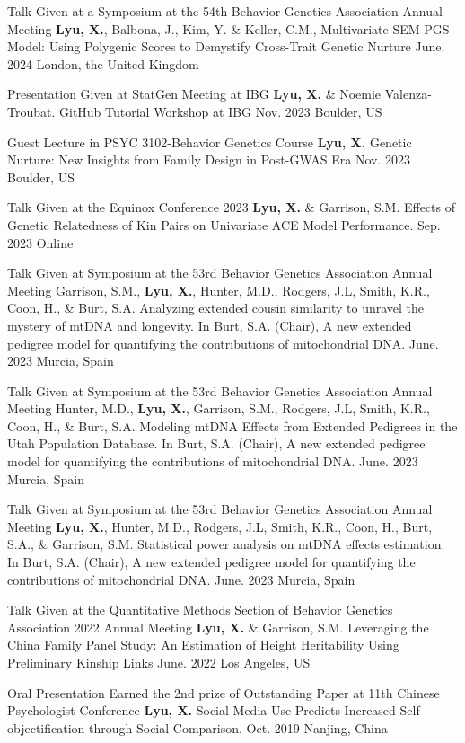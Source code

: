 \begin{cventries2}
    \cventryx
    {Talk Given at a Symposium at the 54th Behavior Genetics Association Annual Meeting} %
    {\textbf{Lyu, X.}, Balbona, J., Kim, Y. \& Keller, C.M., Multivariate SEM-PGS Model: Using Polygenic Scores to Demystify Cross-Trait Genetic Nurture } 
    {June. 2024} %
    {London, the United Kingdom}
    
    \cventryx
	{Presentation Given at StatGen Meeting at IBG} %
    {\textbf{Lyu, X.} \& Noemie Valenza-Troubat. GitHub Tutorial Workshop at IBG} 
    {Nov. 2023} %
    {Boulder, US}
    
    \cventryx
	{Guest Lecture in PSYC 3102-Behavior Genetics Course} %
    {\textbf{Lyu, X.} Genetic Nurture: New Insights from Family Design in Post-GWAS Era} 
    {Nov. 2023} %
    {Boulder, US}
    
    \cventryx
	{Talk Given at the Equinox Conference 2023} %
    {\textbf{Lyu, X.} \& Garrison, S.M. Effects of Genetic Relatedness of Kin Pairs on Univariate ACE Model Performance.} 
    {Sep. 2023} %
    {Online}
    
    \cventryx
	{Talk Given at Symposium at the 53rd Behavior Genetics Association Annual Meeting} %
    {Garrison, S.M., \textbf{Lyu, X.}, Hunter, M.D., Rodgers, J.L, Smith, K.R., Coon, H., \& Burt, S.A. Analyzing extended cousin similarity to unravel the mystery of mtDNA and longevity. In Burt, S.A. (Chair), A new extended pedigree model for quantifying the contributions of mitochondrial DNA.} 
    {June. 2023} %
    {Murcia, Spain}
    
    \cventryx
	{Talk Given at Symposium at the 53rd Behavior Genetics Association Annual Meeting} %
    {Hunter, M.D., \textbf{Lyu, X.}, Garrison, S.M., Rodgers, J.L, Smith, K.R., Coon, H., \& Burt, S.A. Modeling mtDNA Effects from Extended Pedigrees in the Utah Population Database. In Burt, S.A. (Chair), A new extended pedigree model for quantifying the contributions of mitochondrial DNA.} 
    {June. 2023} %
    {Murcia, Spain}
    
    \cventryx
	{Talk Given at Symposium at the 53rd Behavior Genetics Association Annual Meeting} %
    {\textbf{Lyu, X.}, Hunter, M.D., Rodgers, J.L, Smith, K.R., Coon, H., Burt, S.A., \& Garrison, S.M.  Statistical power analysis on mtDNA effects estimation. In Burt, S.A. (Chair), A new extended pedigree model for quantifying the contributions of mitochondrial DNA.} 
    {June. 2023} %
    {Murcia, Spain}
    
    \cventryx
	{Talk Given at the Quantitative Methods Section of Behavior Genetics Association 2022 Annual Meeting} %
    {\textbf{Lyu, X.} \& Garrison, S.M. Leveraging the China Family Panel Study: An Estimation of Height Heritability Using Preliminary Kinship Links } 
    {June. 2022} %
    {Los Angeles, US}
    
    \cventryx
 	{Oral Presentation Earned the 2nd prize of Outstanding Paper at 11th Chinese Psychologist Conference} %
    {\textbf{Lyu, X.} Social Media Use Predicts Increased Self-objectification through Social Comparison.}
    {Oct. 2019}
    {Nanjing, China}
\end{cventries2}